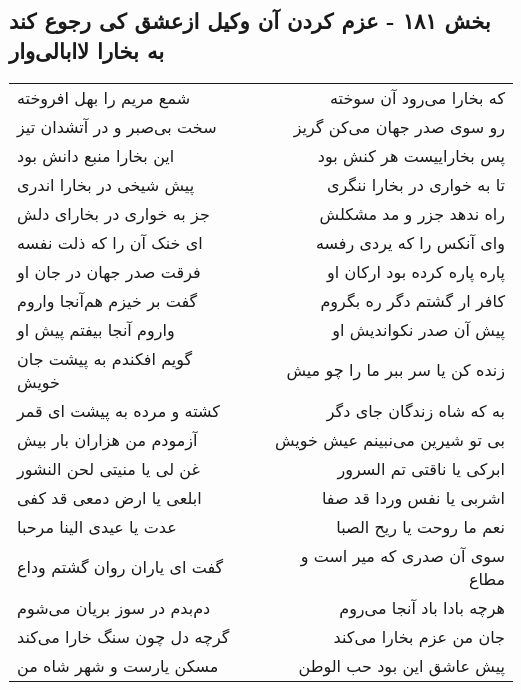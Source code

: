 \begin{center}
\section*{بخش ۱۸۱ - عزم کردن آن وکیل ازعشق کی رجوع کند  به بخارا لاابالی‌وار}
\label{sec:sh181}
\begin{longtable}{l p{0.5cm} r}
شمع مریم را بهل افروخته
&&
که بخارا می‌رود آن سوخته
\\
سخت بی‌صبر و در آتشدان تیز
&&
رو سوی صدر جهان می‌کن گریز
\\
این بخارا منبع دانش بود
&&
پس بخاراییست هر کنش بود
\\
پیش شیخی در بخارا اندری
&&
تا به خواری در بخارا ننگری
\\
جز به خواری در بخارای دلش
&&
راه ندهد جزر و مد مشکلش
\\
ای خنک آن را که ذلت نفسه
&&
وای آنکس را که یردی رفسه
\\
فرقت صدر جهان در جان او
&&
پاره پاره کرده بود ارکان او
\\
گفت بر خیزم هم‌آنجا واروم
&&
کافر ار گشتم دگر ره بگروم
\\
واروم آنجا بیفتم پیش او
&&
پیش آن صدر نکواندیش او
\\
گویم افکندم به پیشت جان خویش
&&
زنده کن یا سر ببر ما را چو میش
\\
کشته و مرده به پیشت ای قمر
&&
به که شاه زندگان جای دگر
\\
آزمودم من هزاران بار بیش
&&
بی تو شیرین می‌نبینم عیش خویش
\\
غن لی یا منیتی لحن النشور
&&
ابرکی یا ناقتی تم السرور
\\
ابلعی یا ارض دمعی قد کفی
&&
اشربی یا نفس وردا قد صفا
\\
عدت یا عیدی الینا مرحبا
&&
نعم ما روحت یا ریح الصبا
\\
گفت ای یاران روان گشتم وداع
&&
سوی آن صدری که میر است و مطاع
\\
دم‌بدم در سوز بریان می‌شوم
&&
هرچه بادا باد آنجا می‌روم
\\
گرچه دل چون سنگ خارا می‌کند
&&
جان من عزم بخارا می‌کند
\\
مسکن یارست و شهر شاه من
&&
پیش عاشق این بود حب الوطن
\\
\end{longtable}
\end{center}
